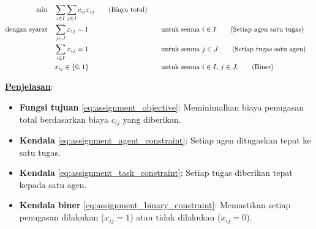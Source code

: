 \medskip
{}

\begin{align*}
\min \quad & \sum_{i \in I} \sum_{j \in J} c_{ij} x_{ij}   \tag{Biaya total}\label{eq:assignment_objective} \\
\mbox{dengan syarat}\quad        & \sum_{j \in J} x_{ij} = 1 &&\quad \mbox{untuk semua } i \in I   \tag{Setiap agen satu tugas}\label{eq:assignment_agent_constraint} \\
             & \sum_{i \in I} x_{ij} = 1 &&\quad \mbox{untuk semua } j \in J   \tag{Setiap tugas satu agen}\label{eq:assignment_task_constraint} \\
             & x_{ij} \in \{0,1\} &&\quad \mbox{untuk semua } i \in I,\, j \in J.   \tag{Biner}\label{eq:assignment_binary_constraint}
\end{align*}

\medskip
\underline{\textbf{Penjelasan}}:
\begin{itemize}
    \item \textbf{Fungsi tujuan} \eqref{eq:assignment_objective}: Meminimalkan biaya penugasan total berdasarkan biaya \( c_{ij} \) yang diberikan.
    \item \textbf{Kendala} \eqref{eq:assignment_agent_constraint}: Setiap agen ditugaskan tepat ke satu tugas.
    \item \textbf{Kendala} \eqref{eq:assignment_task_constraint}: Setiap tugas diberikan tepat kepada satu agen.
    \item \textbf{Kendala biner} \eqref{eq:assignment_binary_constraint}: Memastikan setiap penugasan dilakukan (\( x_{ij} = 1 \)) atau tidak dilakukan (\( x_{ij} = 0 \)).
\end{itemize}


%

